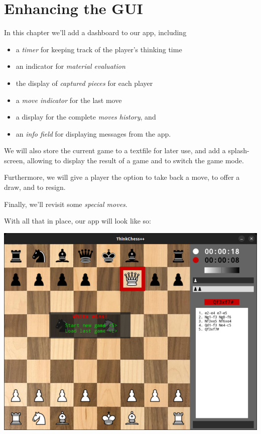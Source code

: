 \chapter{Enhancing the GUI}

In this chapter we'll add a dashboard to our app, including
\begin{itemize}
  \item a \emph{timer} for keeping track of the player's thinking time
  \item an indicator for \emph{material evaluation}
  \item the display of \emph{captured pieces} for each player
  \item a \emph{move indicator} for the last move
  \item a display for the complete \emph{moves history}, and
  \item an \emph{info field} for displaying messages from the app.
\end{itemize}

We will also store the current game to a textfile for later use, and add a splash-screen,
allowing to display the result of a game and to switch the game mode.

Furthermore, we will give a player the option to take back a move, to offer a draw,
and to resign.

Finally, we'll revisit some \emph{special moves}.

With all that in place, our app will look like so:

\begin{center}
\includegraphics[width=\linewidth]{img/display.jpg}
\end{center}

